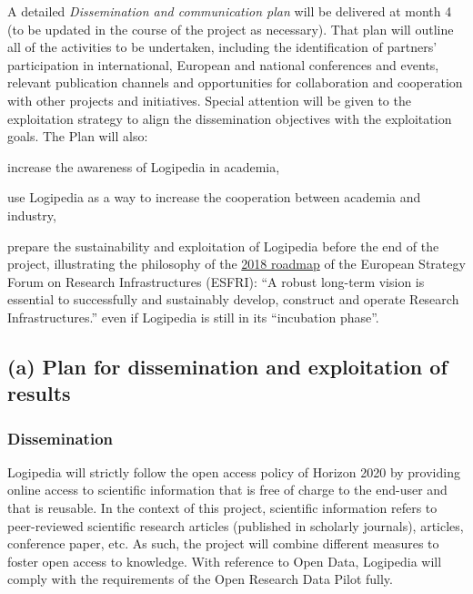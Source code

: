A detailed {\em Dissemination and communication plan} will be
delivered at month 4 (to be updated in the course of the project as
necessary). That plan will outline all of the activities to be
undertaken, including the identification of partners' participation in
international, European and national conferences and events, relevant
publication channels and opportunities for collaboration and
cooperation with other projects and initiatives. Special attention
will be given to the exploitation strategy to align the dissemination
objectives with the exploitation goals. The Plan will also:
\begin{compactitem}
\item increase the awareness of Logipedia in academia, 
\item use Logipedia as a way to increase the cooperation between academia and
industry,
\item prepare the sustainability and exploitation of Logipedia before the
  end of the project, illustrating the philosophy of 
the 
\href{http://roadmap2018.esfri.eu/media/1048/rm2018-part1-20.pdf}{2018
  roadmap} of the European Strategy Forum on Research Infrastructures
(ESFRI): 
``A robust long-term vision is essential to successfully and
sustainably develop, construct and operate Research Infrastructures.''
even if Logipedia is still in its ``incubation phase''.
\end{compactitem}



\subsection*{(a) Plan for dissemination and exploitation of results}
\label{sec:dissemination}


\subsubsection*{Dissemination}

Logipedia will strictly follow the open access policy of Horizon 2020
by providing online access to scientific information that is free of
charge to the end-user and that is reusable. In the context of this
project, scientific information refers to peer-reviewed scientific
research articles (published in scholarly journals), articles,
conference paper, etc. As such, the project will combine different
measures to foster open access to knowledge. With
reference to Open Data, Logipedia will comply with the requirements of
the Open Research Data Pilot fully.




